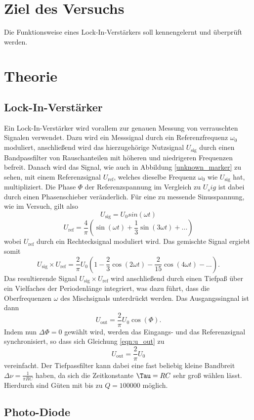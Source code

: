 \section{Ziel des Versuchs}
\label{sec:Ziel des Versuchs}
Die Funktionsweise eines Lock-In-Verstärkers soll kennengelernt und überprüft werden.
\section{Theorie}
\label{sec:Theorie}
\subsection{Lock-In-Verstärker}
    Ein Lock-In-Verstärker wird vorallem zur genauen Messung von verrauschten Signalen verwendet.
    Dazu wird ein Messsignal durch ein Referenzfrequenz $\omega_0$ moduliert, anschließend wird das
    hierzugehörige Nutzsignal $U_\text{sig}$ durch einen Bandpassfilter von Rauschanteilen mit höheren und niedrigeren Frequenzen
    befreit. Danach wird das Signal, wie auch in Abbildung \ref{unknown_marker} zu sehen, mit einem Referenzsignal
    $U_\text{ref}$, welches dieselbe Frequenz $\omega_0$ wie $U_\text{sig}$ hat, multipliziert. Die Phase $\Phi$ der Referenzspannung im Vergleich zu $U_sig$
    ist dabei durch einen Phasenschieber veränderlich. 
    Für eine zu messende Sinusspannung, wie im Versuch, gilt also
    \begin{equation}
        U_\text{sig} = U_0 sin(\omega t)
    \end{equation} 
    \begin{equation}
        U_\text{ref} = \frac {4}{\pi} (\sin (\omega t) + \frac {1}{3} \sin(3 \omega t) + ... )
    \end{equation}
    wobei $U_\text{ref}$ durch ein Rechtecksignal moduliert wird. Das gemischte Signal ergiebt somit
    \begin{equation}
        U_\text{sig} \times U_\text{ref} = \frac {2}{\pi} U_0 (1- \frac{2}{3} \cos (2 \omega t) - \frac {2}{15} \cos (4 \omega t) - ...).
    \end{equation}
    Das resultierende Signal $U_\text{sig} \times U_\text{ref}$ wird anschließend durch einen Tiefpaß über ein Vielfaches der Periodenlänge
    integriert, was dazu führt, dass die Oberfrequenzen $\omega$ des Mischsignals unterdrückt werden. Das Ausgangssingnal ist dann
    \begin{equation}
    \label{eqn:u_out}
        U_\text{out} = \frac{2}{\pi} U_0 \cos (\Phi) .
    \end{equation}
    Indem nun $\Delta \Phi = 0$ gewählt wird, werden das Eingangs- und das Referenzsignal synchronisiert, so dass sich Gleichung \ref{eqn:u_out}
    zu
    \begin{equation}
        U_\text{out} = \frac{2}{\pi} U_0
    \end{equation}
    vereinfacht. Der Tiefpassfilter kann dabei eine fast beliebig kleine Bandbreit $\Delta \nu  = \frac{1}{\pi R C}$ haben, da sich die Zeitkonstante $\Tau = R C$ sehr groß wählen lässt.
    Hierdurch sind Güten mit bis zu $Q = 100000$ möglich.
\subsection{Photo-Diode}